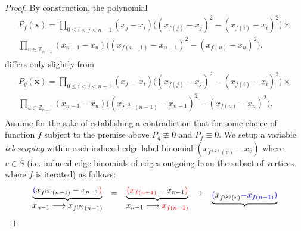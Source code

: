 \begin{proof}
By construction, the polynomial
\begin{equation}\label{eq:Pf_broken}
\begin{array}{c}
P_{f}(\mathbf{x})=\underset{0\le i<j<n-1}{\prod}(x_{j}-x_{i})\big((x_{f(j)}-x_{j})^{2}-(x_{f(i)}-x_{i})^{2}\big)\times\\[10pt]
\underset{u\in\mathbb{Z}_{n-1}}{\prod}(x_{n-1}-x_{u})\big((x_{f(n-1)}-x_{n-1})^{2}-(x_{f(u)}-x_{u})^{2}\big).\\[10pt]
\end{array}
\end{equation}
differs only slightly from
\begin{equation}\label{eq:Pg_broken}
\begin{array}{c}
P_{g}(\mathbf{x})=\underset{0\le i<j<n-1}{\prod}(x_{j}-x_{i})\big((x_{f(j)}-x_{j})^{2}-(x_{f(i)}-x_{i})^{2}\big)\times\\[10pt]
\underset{u\in\mathbb{Z}_{n-1}}{\prod}(x_{n-1}-x_{u})\big((x_{f^{(2)}(n-1)}-x_{n-1})^{2}-(x_{f(u)}-x_{u})^{2}\big).\\[10pt]
\end{array}
\end{equation}
Assume for the sake of establishing a contradiction that for some choice of function $f$ subject to the premise above $P_{g}\not\equiv0$ and $P_{f}\equiv0$.
We setup a variable \emph{telescoping} within each induced edge label binomial $(x_{f^{\left(2\right)}\left(v\right)}-x_{v})$
where $v\in S$
(i.e. induced edge binomials of edges outgoing from the subset of vertices where $f$ is iterated) as follows:
\[
\begin{array}{c}
\underbrace{{\color{blue}(}x_{f^{(2)}(n-1)}-x_{n-1}{\color{red})}}\\
x_{n-1}\longrightarrow x_{f^{(2)}(n-1)}
\end{array}\begin{array}{c}
=\\
\\
\end{array}\begin{array}{c}
\underbrace{{\color{red}(x_{f(n-1)}}-x_{n-1}{\color{red})}}\\
x_{n-1}\longrightarrow{\color{red}x_{f(n-1)}}
\end{array}\begin{array}{c}
+\\
\\
\end{array}\begin{array}{c}
\underbrace{{\color{blue}(}x_{f^{(2)}(v)}{\color{blue}-x_{f(n-1)}}{\color{blue})}}\\

\end{array}\]
\end{proof}
